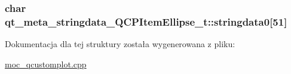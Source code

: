 \subsubsection[{\texorpdfstring{stringdata0}{stringdata0}}]{\setlength{\rightskip}{0pt plus 5cm}char qt\+\_\+meta\+\_\+stringdata\+\_\+\+Q\+C\+P\+Item\+Ellipse\+\_\+t\+::stringdata0\mbox{[}51\mbox{]}}\hypertarget{structqt__meta__stringdata___q_c_p_item_ellipse__t_a47fd49f50069acd98fc8a4f2dec3672a}{}\label{structqt__meta__stringdata___q_c_p_item_ellipse__t_a47fd49f50069acd98fc8a4f2dec3672a}


Dokumentacja dla tej struktury została wygenerowana z pliku\+:\begin{DoxyCompactItemize}
\item 
\hyperlink{moc__qcustomplot_8cpp}{moc\+\_\+qcustomplot.\+cpp}\end{DoxyCompactItemize}
